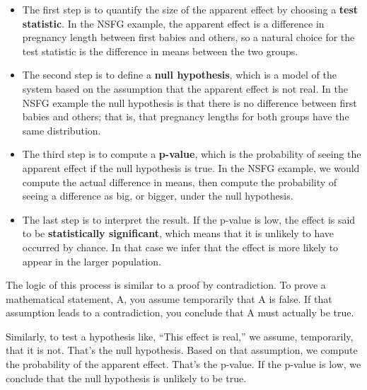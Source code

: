 \documentclass[12pt]{book}
\begin{document}
\begin{itemize}

\item The first step is to quantify the size of the apparent effect by
  choosing a {\bf test statistic}.  In the NSFG example, the apparent
  effect is a difference in pregnancy length between first babies and
  others, so a natural choice for the test statistic is the difference
  in means between the two groups.

\item The second step is to define a {\bf null hypothesis}, which is a
  model of the system based on the assumption that the apparent effect
  is not real.  In the NSFG example the null hypothesis is that there
  is no difference between first babies and others; that is, that
  pregnancy lengths for both groups have the same distribution.

\item The third step is to compute a {\bf p-value}, which is the
  probability of seeing the apparent effect if the null hypothesis is
  true.  In the NSFG example, we would compute the actual difference
  in means, then compute the probability of seeing a
  difference as big, or bigger, under the null hypothesis.

\item The last step is to interpret the result.  If the p-value is
  low, the effect is said to be {\bf statistically significant}, which
  means that it is unlikely to have occurred by chance.  In that case
  we infer that the effect is more likely to appear in the larger
  population.   

\end{itemize}

The logic of this process is similar to a proof by
contradiction.  To prove a mathematical statement, A, you assume
temporarily that A is false.  If that assumption leads to a
contradiction, you conclude that A must actually be true.

Similarly, to test a hypothesis like, ``This effect is real,'' we
assume, temporarily, that it is not.  That's the null hypothesis.
Based on that assumption, we compute the probability of the apparent
effect.  That's the p-value.  If the p-value is low, we
conclude that the null hypothesis is unlikely to be true.
\end{document}
